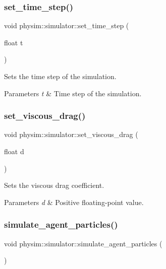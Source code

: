 \subsubsection{\texorpdfstring{set\+\_\+time\+\_\+step()}{set\_time\_step()}}
{\footnotesize\ttfamily void physim\+::simulator\+::set\+\_\+time\+\_\+step (\begin{DoxyParamCaption}\item[{float}]{t }\end{DoxyParamCaption})}



Sets the time step of the simulation. 


\begin{DoxyParams}{Parameters}
{\em t} & Time step of the simulation. \\
\hline
\end{DoxyParams}
\mbox{\label{classphysim_1_1simulator_a6e6fc481334928bdcb13fa309fb62748}} 
\subsubsection{\texorpdfstring{set\+\_\+viscous\+\_\+drag()}{set\_viscous\_drag()}}
{\footnotesize\ttfamily void physim\+::simulator\+::set\+\_\+viscous\+\_\+drag (\begin{DoxyParamCaption}\item[{float}]{d }\end{DoxyParamCaption})}



Sets the viscous drag coefficient. 


\begin{DoxyParams}{Parameters}
{\em d} & Positive floating-\/point value. \\
\hline
\end{DoxyParams}
\mbox{\label{classphysim_1_1simulator_a99dbf5870ec5383266f87e60c1686049}} 
\subsubsection{\texorpdfstring{simulate\+\_\+agent\+\_\+particles()}{simulate\_agent\_particles()}}
{\footnotesize\ttfamily void physim\+::simulator\+::simulate\+\_\+agent\+\_\+particles (\begin{DoxyParamCaption}{ }\end{DoxyParamCaption})}




